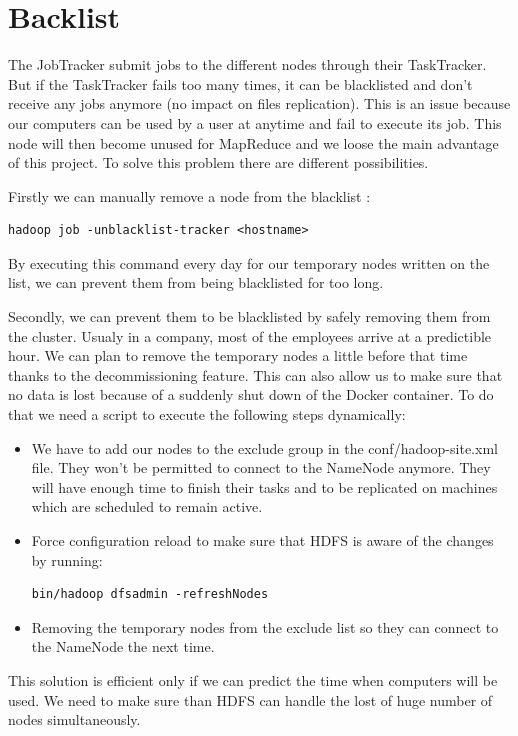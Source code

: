 \documentclass[11pt]{report} %
\begin{document}
\section{Backlist}

The JobTracker submit jobs to the different nodes through their TaskTracker. But if the TaskTracker fails too many times, it can be blacklisted and don't receive any jobs anymore (no impact on files replication). This is an issue because our computers can be used by a user at anytime and fail to execute its job. This node will then become unused for MapReduce and we loose the main advantage of this project.
To solve this problem there are different possibilities.


Firstly we can manually remove a node from the blacklist : 
\begin{lstlisting}
hadoop job -unblacklist-tracker <hostname>
\end{lstlisting}
By executing this command every day for our temporary nodes written on the list, we can prevent them from being blacklisted for too long.

Secondly, we can prevent them to be blacklisted by safely removing them from the cluster.
Usualy in a company, most of the employees arrive at a predictible hour. We can plan to remove the temporary nodes a little before that time thanks to the decommissioning feature.
This can also allow us to make sure that no data is lost because of a suddenly shut down of the Docker container. To do that we need a script to execute the following steps dynamically:
\begin{itemize}
\item We have to add our nodes to the exclude group in the conf/hadoop-site.xml file. They won't be permitted to connect to the NameNode anymore. They will have enough time to finish their tasks and to be replicated on machines which are scheduled to remain active.
\item Force configuration reload to make sure that HDFS is aware of the changes by running:
\begin{lstlisting}
bin/hadoop dfsadmin -refreshNodes
\end{lstlisting}
\item Removing the temporary nodes from the exclude list so they can connect to the NameNode the next time.
\end{itemize}

This solution is efficient only if we can predict the time when computers will be used. We need to make sure than HDFS can handle the lost of huge number of nodes simultaneously.
\end{document}
